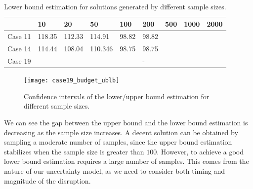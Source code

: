 \documentclass[11pt]{article}
\begin{document}
	\begin{table}[H]
		\centering
		\begin{tabular}{ c | l l l l l l l l}
			\hline
			& 10 & 20 & 50 & 100 & 200 & 500 & 1000 & 2000 \\ \hline
			Case 11& 118.35 & 112.33 & 114.91 & 98.82 & 98.82 & &  \\
			Case 14 & 114.44 & 108.04 & 110.346 & 98.75 & 98.75 & &  \\
			Case 19 & & & &  & - & & \\
			\hline
		\end{tabular}
		\caption{Lower bound estimation for solutions generated by different sample sizes.}
		\label{table:budgetL}
	\end{table}
	
	\begin{figure}
		\centering
		\texttt{[image: case19\_budget\_ublb]}
		\caption{Confidence intervals of the lower/upper bound estimation for different sample sizes.}
		\label{fig:budget}
	\end{figure}
	We can see the gap between the upper bound and the lower bound estimation is decreasing as the sample size increases. A decent solution can be obtained by sampling a moderate number of samples, since the upper bound estimation stabilizes when the sample size is greater than \(100\). However, to achieve a good lower bound estimation requires a large number of samples. This comes from the nature of our uncertainty model, as we need to consider both timing and magnitude of the disruption. 
\end{document}
